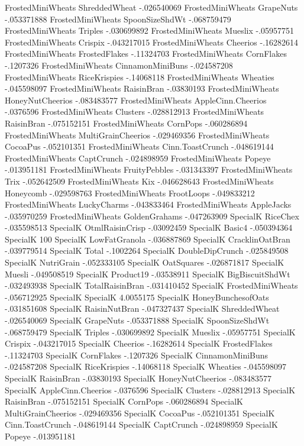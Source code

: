 FrostedMiniWheats	ShreddedWheat	-.026540069
FrostedMiniWheats	GrapeNuts	-.053371888
FrostedMiniWheats	SpoonSizeShdWt	-.068759479
FrostedMiniWheats	Triples	-.030699892
FrostedMiniWheats	Mueslix	-.05957751
FrostedMiniWheats	Crispix	-.043217015
FrostedMiniWheats	Cheerios	-.16282614
FrostedMiniWheats	FrostedFlakes	-.11324703
FrostedMiniWheats	CornFlakes	-.1207326
FrostedMiniWheats	CinnamonMiniBuns	-.024587208
FrostedMiniWheats	RiceKrispies	-.14068118
FrostedMiniWheats	Wheaties	-.045598097
FrostedMiniWheats	RaisinBran	-.03830193
FrostedMiniWheats	HoneyNutCheerios	-.083483577
FrostedMiniWheats	AppleCinn.Cheerios	-.0376596
FrostedMiniWheats	Clusters	-.028812913
FrostedMiniWheats	RaisinBran	-.075152151
FrostedMiniWheats	CornPops	-.060286894
FrostedMiniWheats	MultiGrainCheerios	-.029469356
FrostedMiniWheats	CocoaPus	-.052101351
FrostedMiniWheats	Cinn.ToastCrunch	-.048619144
FrostedMiniWheats	CaptCrunch	-.024898959
FrostedMiniWheats	Popeye	-.013951181
FrostedMiniWheats	FruityPebbles	-.031343397
FrostedMiniWheats	Trix	-.052642509
FrostedMiniWheats	Kix	-.046628643
FrostedMiniWheats	Honeycomb	-.029598763
FrostedMiniWheats	FrootLoops	-.049833212
FrostedMiniWheats	LuckyCharms	-.043833464
FrostedMiniWheats	AppleJacks	-.035970259
FrostedMiniWheats	GoldenGrahams	-.047263909
SpecialK	RiceChex	-.035598513
SpecialK	OtmlRaisinCrisp	-.03092459
SpecialK	Basic4	-.050394364
SpecialK	100%
SpecialK	LowFatGranola	-.036887869
SpecialK	CracklinOatBran	-.039779514
SpecialK	Total	-.1002264
SpecialK	DoubleDipCrunch	-.025849508
SpecialK	NutriGrain	-.052333105
SpecialK	OatSquares	-.026871817
SpecialK	Muesli	-.049508519
SpecialK	Product19	-.03538911
SpecialK	BigBiscuitShdWt	-.032493938
SpecialK	TotalRaisinBran	-.031410452
SpecialK	FrostedMiniWheats	-.056712925
SpecialK	SpecialK	4.0055175
SpecialK	HoneyBunchesofOats	-.031851608
SpecialK	RaisinNutBran	-.047327437
SpecialK	ShreddedWheat	-.026540069
SpecialK	GrapeNuts	-.053371888
SpecialK	SpoonSizeShdWt	-.068759479
SpecialK	Triples	-.030699892
SpecialK	Mueslix	-.05957751
SpecialK	Crispix	-.043217015
SpecialK	Cheerios	-.16282614
SpecialK	FrostedFlakes	-.11324703
SpecialK	CornFlakes	-.1207326
SpecialK	CinnamonMiniBuns	-.024587208
SpecialK	RiceKrispies	-.14068118
SpecialK	Wheaties	-.045598097
SpecialK	RaisinBran	-.03830193
SpecialK	HoneyNutCheerios	-.083483577
SpecialK	AppleCinn.Cheerios	-.0376596
SpecialK	Clusters	-.028812913
SpecialK	RaisinBran	-.075152151
SpecialK	CornPops	-.060286894
SpecialK	MultiGrainCheerios	-.029469356
SpecialK	CocoaPus	-.052101351
SpecialK	Cinn.ToastCrunch	-.048619144
SpecialK	CaptCrunch	-.024898959
SpecialK	Popeye	-.013951181
